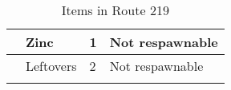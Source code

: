 \begin{longtable}{|| l l l l ||}%
\hline%
&Zinc&1&Not respawnable\\%
\hline%
&Leftovers&2&Not respawnable\\%
\hline%
\endhead%
\hline%
\caption{Items in Route 219}%
\label{tab:Route219Items}%
\end{longtable}